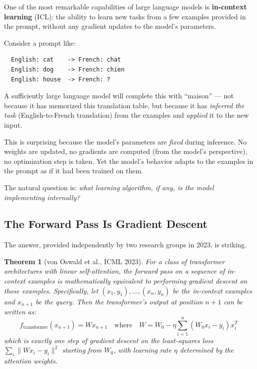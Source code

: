 \documentclass[11pt, a4paper]{article}
\theoremstyle{definition}
\theoremstyle{plain}
\newtheorem{theorem}{Theorem}[section]
\begin{document}
One of the most remarkable capabilities of large language models is
\textbf{in-context learning} (ICL): the ability to learn new tasks from
a few examples provided in the prompt, without any gradient updates to
the model's parameters.

\begin{examplebox}[title={In-Context Learning}]
Consider a prompt like:
\begin{verbatim}
  English: cat    -> French: chat
  English: dog    -> French: chien
  English: house  -> French: ?
\end{verbatim}
A sufficiently large language model will complete this with ``maison'' ---
not because it has memorized this translation table, but because it has
\emph{inferred the task} (English-to-French translation) from the examples
and \emph{applied} it to the new input.
\end{examplebox}

This is surprising because the model's parameters are \emph{fixed} during
inference.  No weights are updated, no gradients are computed (from the
model's perspective), no optimization step is taken.  Yet the model's
behavior adapts to the examples in the prompt as if it had been trained on
them.

The natural question is: \emph{what learning algorithm, if any, is the
model implementing internally?}

\subsection{The Forward Pass Is Gradient Descent}
\label{sec:icl_gd}

The answer, provided independently by two research groups in 2023, is
striking.

\begin{theorem}[von Oswald et al., ICML 2023]
\label{thm:icl_gd}
For a class of transformer architectures with linear self-attention,
the forward pass on a sequence of in-context examples is mathematically
equivalent to performing gradient descent on those examples.
Specifically, let $(x_1, y_1), \ldots, (x_n, y_n)$ be the in-context
examples and $x_{n+1}$ be the query.  Then the transformer's output at
position $n+1$ can be written as:
\begin{equation}
  f_{\text{transformer}}(x_{n+1}) = W x_{n+1}
  \quad\text{where}\quad
  W = W_0 - \eta \sum_{i=1}^{n} (W_0 x_i - y_i) x_i^T
  \label{eq:icl_gd}
\end{equation}
which is exactly one step of gradient descent on the least-squares loss
$\sum_i \|Wx_i - y_i\|^2$ starting from $W_0$, with learning rate $\eta$
determined by the attention weights.
\end{theorem}
\end{document}
